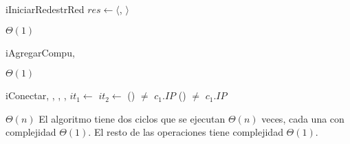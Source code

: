 \begin{Algoritmos}

  \nuevoAlgo
  \begin{algoritmo}{iIniciarRed}{}{estrRed}
    $res \gets \langle$\vacio{}, \vacio{}$\rangle$ 
  \end{algoritmo}
  \datosAlgoritmo{} %
  {} %
  {} %
  {$\Theta(1)$} %
  {} %

  \nuevoAlgo
  \begin{algoritmo}{iAgregarCompu}{, }{}
     
     
  \end{algoritmo}
  \datosAlgoritmo{} %
  {} %
  {} %
  {$\Theta(1)$} %
  {} %

  
  
  \nuevoAlgo
  \begin{algoritmo}{iConectar}{, , , , }{}
     $it_1 \gets$  
     $it_2 \gets$  
    \While(){ $\neq$ $c_1.IP$}{
       
    }
    \While(){ $\neq$ $c_1.IP$}{
       
    }
     
     
  \end{algoritmo}
  \datosAlgoritmo{} %
  {} %
  {} %
  {$\Theta(n)$} %
  {El algoritmo tiene dos ciclos que se ejecutan $\Theta(n)$ veces, cada una con complejidad $\Theta(1)$. El resto de las operaciones tiene complejidad $\Theta(1)$.} %
  

\end{Algoritmos}
